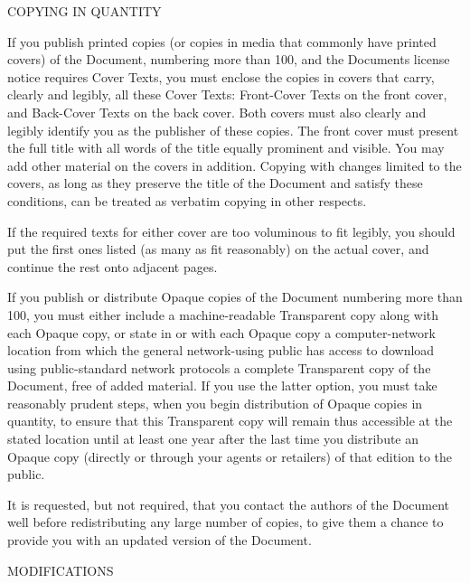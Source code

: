 \begin{DoxyEnumerate}
\item C\+O\+P\+Y\+I\+NG IN Q\+U\+A\+N\+T\+I\+TY
\end{DoxyEnumerate}

If you publish printed copies (or copies in media that commonly have printed covers) of the Document, numbering more than 100, and the Document\textquotesingle{}s license notice requires Cover Texts, you must enclose the copies in covers that carry, clearly and legibly, all these Cover Texts\+: Front-\/\+Cover Texts on the front cover, and Back-\/\+Cover Texts on the back cover. Both covers must also clearly and legibly identify you as the publisher of these copies. The front cover must present the full title with all words of the title equally prominent and visible. You may add other material on the covers in addition. Copying with changes limited to the covers, as long as they preserve the title of the Document and satisfy these conditions, can be treated as verbatim copying in other respects.

If the required texts for either cover are too voluminous to fit legibly, you should put the first ones listed (as many as fit reasonably) on the actual cover, and continue the rest onto adjacent pages.

If you publish or distribute Opaque copies of the Document numbering more than 100, you must either include a machine-\/readable Transparent copy along with each Opaque copy, or state in or with each Opaque copy a computer-\/network location from which the general network-\/using public has access to download using public-\/standard network protocols a complete Transparent copy of the Document, free of added material. If you use the latter option, you must take reasonably prudent steps, when you begin distribution of Opaque copies in quantity, to ensure that this Transparent copy will remain thus accessible at the stated location until at least one year after the last time you distribute an Opaque copy (directly or through your agents or retailers) of that edition to the public.

It is requested, but not required, that you contact the authors of the Document well before redistributing any large number of copies, to give them a chance to provide you with an updated version of the Document.


\begin{DoxyEnumerate}
\item M\+O\+D\+I\+F\+I\+C\+A\+T\+I\+O\+NS
\end{DoxyEnumerate}

